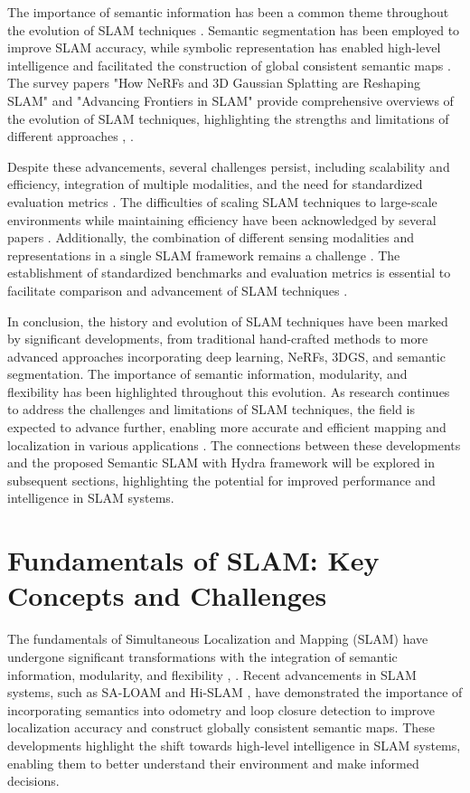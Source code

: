 \documentclass[conference]{IEEEtran}
\begin{document}
The importance of semantic information has been a common theme throughout the evolution of SLAM techniques \cite{b7}. Semantic segmentation has been employed to improve SLAM accuracy, while symbolic representation has enabled high-level intelligence and facilitated the construction of global consistent semantic maps \cite{b8}. The survey papers "How NeRFs and 3D Gaussian Splatting are Reshaping SLAM" and "Advancing Frontiers in SLAM" provide comprehensive overviews of the evolution of SLAM techniques, highlighting the strengths and limitations of different approaches \cite{b9}, \cite{b10}.

Despite these advancements, several challenges persist, including scalability and efficiency, integration of multiple modalities, and the need for standardized evaluation metrics \cite{b11}. The difficulties of scaling SLAM techniques to large-scale environments while maintaining efficiency have been acknowledged by several papers \cite{b12}. Additionally, the combination of different sensing modalities and representations in a single SLAM framework remains a challenge \cite{b13}. The establishment of standardized benchmarks and evaluation metrics is essential to facilitate comparison and advancement of SLAM techniques \cite{b14}.

In conclusion, the history and evolution of SLAM techniques have been marked by significant developments, from traditional hand-crafted methods to more advanced approaches incorporating deep learning, NeRFs, 3DGS, and semantic segmentation. The importance of semantic information, modularity, and flexibility has been highlighted throughout this evolution. As research continues to address the challenges and limitations of SLAM techniques, the field is expected to advance further, enabling more accurate and efficient mapping and localization in various applications \cite{b15}. The connections between these developments and the proposed Semantic SLAM with Hydra framework will be explored in subsequent sections, highlighting the potential for improved performance and intelligence in SLAM systems.

\section{Fundamentals of SLAM: Key Concepts and Challenges}
The fundamentals of Simultaneous Localization and Mapping (SLAM) have undergone significant transformations with the integration of semantic information, modularity, and flexibility \cite{b1}, \cite{b2}. Recent advancements in SLAM systems, such as SA-LOAM \cite{b3} and Hi-SLAM \cite{b4}, have demonstrated the importance of incorporating semantics into odometry and loop closure detection to improve localization accuracy and construct globally consistent semantic maps. These developments highlight the shift towards high-level intelligence in SLAM systems, enabling them to better understand their environment and make informed decisions.
\end{document}
